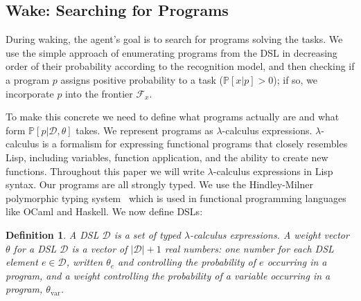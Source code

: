 \documentclass{article}
\newcommand{\code}[1]{{\footnotesize\texttt{#1}}}
\newcommand{\probability}{\mathds{P}} %
\newtheorem{definition}{Definition}
\begin{document}
\subsection{Wake: Searching for Programs}\label{explorationSection}

During waking, the agent's goal is to search for programs solving the tasks.  We use the simple approach of enumerating programs from
the DSL  in decreasing order of their probability according to the recognition model,
and then checking if a program $p$ assigns positive
probability to a task ($\probability[x|p] > 0$); if so, we incorporate $p$ 
into the frontier $\mathcal{F}_x$.

To make this concrete we need to define what programs actually are and
what form $\probability[p |\mathcal{D},\theta]$ takes.
We represent programs as $\lambda$-calculus expressions.
$\lambda$-calculus is a formalism for expressing functional programs
that closely resembles Lisp,
including variables, function application, and the ability to create new functions.
Throughout this paper we will write $\lambda$-calculus expressions in Lisp syntax.
Our programs are all strongly typed.
We use the Hindley-Milner polymorphic typing system~\cite{pierce} which is
used in functional programming languages like OCaml and Haskell.
We now define DSLs:

\begin{definition}
A DSL $\mathcal{D}$ is a set of typed $\lambda$-calculus expressions.
A weight vector $\theta$ for a DSL $\mathcal{D}$ is a vector of $|\mathcal{D}| + 1$ real numbers:
one number for each DSL element $e\in \mathcal{D}$, written $\theta_e$ and controlling the probability of  $e$ occurring in a program,
and a weight controlling the probability of a variable occurring in a program, $\theta_{\text{var}}$.
\end{definition}
\end{document}
